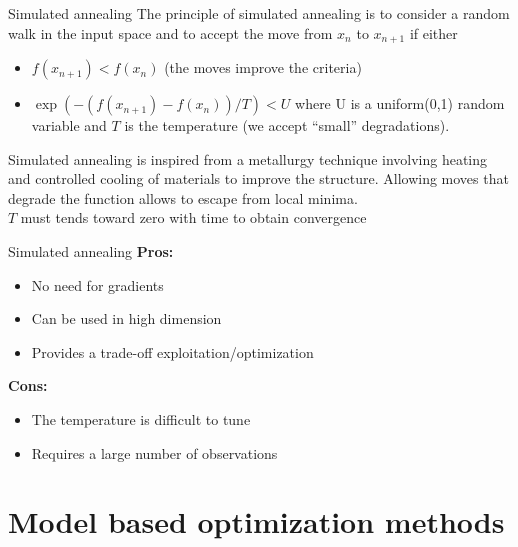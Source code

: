 \documentclass{beamer}
\begin{document}
\begin{frame}{Simulated annealing}
The principle of simulated annealing is to consider a random walk in the input space and to accept the move from $x_n$ to $x_{n+1}$ if either
\begin{itemize}
	\item $f(x_{n+1}) < f(x_{n})$ (the moves improve the criteria)
	\item $\exp(-(f(x_{n+1})-f(x_{n}))/T) < U$ where U is a uniform(0,1) random variable and $T$ is the temperature (we accept ``small'' degradations).
\end{itemize}
\vspace{3mm}
Simulated annealing is inspired from a metallurgy technique involving heating and controlled cooling of materials to improve the structure.
\vspace{3mm}
Allowing moves that degrade the function allows to escape from local minima.\\
\vspace{3mm}
$T$ must tends toward zero with time to obtain convergence
\end{frame}

\begin{frame}{Simulated annealing}
\textbf{Pros:}
\begin{itemize}
	\item No need for gradients
	\item Can be used in high dimension
	\item Provides a trade-off exploitation/optimization
\end{itemize}
\vspace{3mm}
\textbf{Cons:}
\begin{itemize}
	\item The temperature is difficult to tune
	\item Requires a large number of observations
\end{itemize}
\end{frame}

\section[Model based optim.]{Model based optimization methods}
\subsection{}
\end{document}

